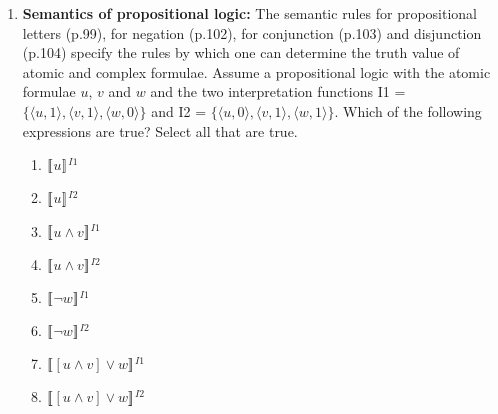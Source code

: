 \documentclass[a4,11pt]{article}
\newcommand{\6}{\mbox{$[\hspace*{-.6mm}[$}}
\newcommand{\9}{\mbox{$]\hspace*{-.6mm}]$}}
\newcommand{\sem}[2]{\6#1\9$^{#2}$}
\begin{document}
\begin{enumerate}[leftmargin = 12pt]
(j) is not well-formed because the negation applies not to a well-formed formula but rather to $\vee w$, which is not a formula, and therefore cannot serve as the argument for negation.


\item {\bf Semantics of propositional logic:} The semantic rules for propositional letters (p.99), for negation (p.102), for conjunction (p.103) and disjunction (p.104) specify the rules by which one can determine the truth value of atomic and complex formulae. Assume a propositional logic with the atomic formulae $u$, $v$ and $w$ and the two interpretation functions I1 = $\{\langle u, 1\rangle, \langle v, 1\rangle, \langle w, 0\rangle\}$ and I2 = $\{\langle u, 0\rangle, \langle v, 1\rangle, \langle w, 1\rangle\}$. Which of the following expressions are true? Select all that are true.


\begin{enumerate}[noitemsep]
\item \sem{$u$}{I1} \hspace*{2cm} 

\item \sem{$u$}{I2} \hspace*{2cm} %


\item \sem{$u \wedge v$}{I1} \hspace*{2cm} %

\item \sem{$u \wedge v$}{I2} \hspace*{2cm} %


\item \sem{$\neg w$}{I1} \hspace*{2cm} %

\item \sem{$\neg w$}{I2} \hspace*{2cm} %


\item \sem{$[u \wedge v] \vee w$}{I1} \hspace*{2cm} %

\item \sem{$[u \wedge v] \vee w$}{I2} \hspace*{2cm} %

\end{enumerate}


\end{enumerate}
\end{document}
